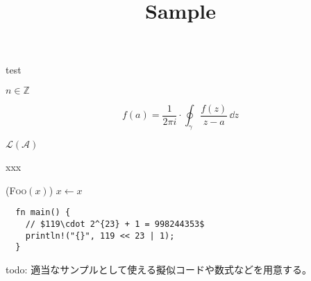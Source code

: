 \documentclass[lualatex, ja=standard]{ltjsarticle}
\author{\lato{\textcolor{useryellow}{\textbf{rsk0315}}}}
\title{Sample}
\date{\directlua{commit_hash_and_date("\jobname.tex")}}
\begin{document}
\maketitle

test

$n \in \mathbb{Z}$

$$
f(a) = \frac{1}{2\pi i}\cdot \oint_{\gamma} \frac{f(z)}{z-a} \, \dd{z}
$$

$\mathcal{L}(\mathcal{A})$

\begin{alg}
  \caption{xxx}
  \Function(\textsc{Foo}{$(x)$}){
    {$x \gets x$}\;
  }
\end{alg}

\begin{verbatim}
  fn main() {
    // $119\cdot 2^{23} + 1 = 998244353$
    println!("{}", 119 << 23 | 1);
  }
\end{verbatim}

todo: 適当なサンプルとして使える擬似コードや数式などを用意する。
\end{document}

